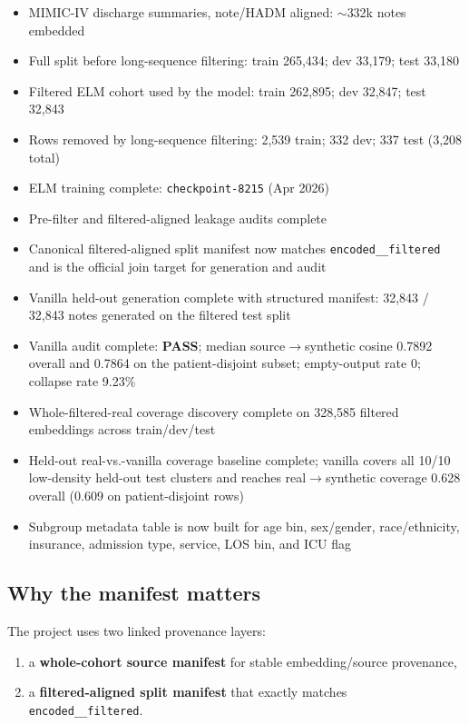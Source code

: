 \documentclass[11pt]{article}
\begin{document}
\begin{itemize}[nosep]
  \item MIMIC-IV discharge summaries, note/HADM aligned: $\sim$332k notes embedded
  \item Full split before long-sequence filtering: train 265,434; dev 33,179; test 33,180
  \item Filtered ELM cohort used by the model: train 262,895; dev 32,847; test 32,843
  \item Rows removed by long-sequence filtering: 2,539 train; 332 dev; 337 test (3,208 total)
  \item ELM training complete: \texttt{checkpoint-8215} (Apr 2026)
  \item Pre-filter and filtered-aligned leakage audits complete
  \item Canonical filtered-aligned split manifest now matches \texttt{encoded\_\*\_filtered} and is the official join target for generation and audit
  \item Vanilla held-out generation complete with structured manifest: 32,843 / 32,843 notes generated on the filtered test split
  \item Vanilla audit complete: \textbf{PASS}; median source$\rightarrow$synthetic cosine 0.7892 overall and 0.7864 on the patient-disjoint subset; empty-output rate 0; collapse rate 9.23\%
  \item Whole-filtered-real coverage discovery complete on 328,585 filtered embeddings across train/dev/test
  \item Held-out real-vs.-vanilla coverage baseline complete; vanilla covers all 10/10 low-density held-out test clusters and reaches real$\rightarrow$synthetic coverage 0.628 overall (0.609 on patient-disjoint rows)
  \item Subgroup metadata table is now built for age bin, sex/gender, race/ethnicity, insurance, admission type, service, LOS bin, and ICU flag
\end{itemize}

\subsection{Why the manifest matters}

The project uses two linked provenance layers:
\begin{enumerate}[nosep]
  \item a \textbf{whole-cohort source manifest} for stable embedding/source provenance,
  \item a \textbf{filtered-aligned split manifest} that exactly matches \texttt{encoded\_\*\_filtered}.
\end{enumerate}
\end{document}

